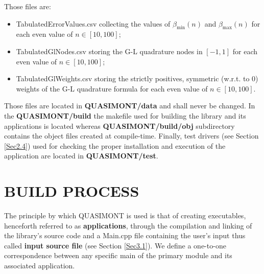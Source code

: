 \documentclass[a4paper, twosided]{book}
\begin{document}
\newpage
\noindent 
 Those files are:
\begin{itemize}
    \item \colorbox{poliGrayBlue}{TabulatedErrorValues.csv} collecting the values of $\beta_{\text{min}}(n)$ and $\beta_{\text{max}}(n)$ for each even value of $n\in[10,100]$;
    \item \colorbox{poliGrayBlue}{TabulatedGlNodes.csv} storing the G-L quadrature nodes in $[-1,1]$ for each even value of $n\in[10,100]$;
    \item \colorbox{poliGrayBlue}{TabulatedGlWeights.csv} storing the strictly positives, symmetric (w.r.t. to $0$) weights of the G-L quadrature formula for each even value of $n\in[10,100]$.
\end{itemize}
Those files are located in \colorbox{poliGrayBlue}{\textbf{QUASIMONT/data}} and shall never be changed. In the \colorbox{poliGrayBlue}{\textbf{QUASIMONT/build}} the \colorbox{poliGrayBlue}{makefile} used for building the library and its applications is located whereas \colorbox{poliGrayBlue}{\textbf{QUASIMONT/build/obj}} subdirectory contains the object files created at compile-time. Finally, test drivers (see Section \ref{Sec2.4}) used for checking the proper installation and execution of the application are located in \colorbox{poliGrayBlue}{\textbf{QUASIMONT/test}}.

\section[Build process]{\changefont BUILD PROCESS}\label{Sec2.3}

\noindent
The principle by which QUASIMONT is used is that of creating executables, henceforth referred to as \color{poliDarkBlue} \textbf{applications}\color{black}, through the compilation and linking of the library's source code and a \colorbox{poliGrayBlue}{Main.cpp} file containing the user's input thus called \color{poliDarkBlue} \textbf{input source file} \color{black} (see Section \ref{Sec3.1}). We define a one-to-one correspondence between any specific \colorbox{poliGrayBlue}{main} of the primary module and its associated application. 

\end{document}
